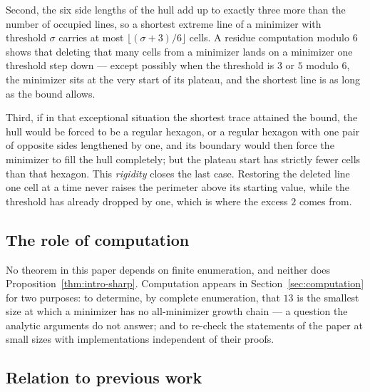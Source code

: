 \documentclass[11pt]{article}
\theoremstyle{plain}
\theoremstyle{definition}
\theoremstyle{remark}
\begin{document}
Second, the six side lengths of the hull add up to exactly three more than the number of
occupied lines, so a shortest extreme line of a minimizer with threshold \(\sigma\) carries at
most \(\lfloor(\sigma+3)/6\rfloor\) cells. A residue computation modulo \(6\) shows that
deleting that many cells from a minimizer lands on a minimizer one threshold step down ---
except possibly when the threshold is \(3\) or \(5\) modulo \(6\), the minimizer sits at the
very start of its plateau, and the shortest line is as long as the bound allows.

Third, if in that exceptional situation the shortest trace attained the bound, the hull
would be forced to be a regular hexagon, or a regular hexagon with one pair of opposite
sides lengthened by one, and its boundary would then force the minimizer to fill the hull
completely; but the plateau start has strictly fewer cells than that hexagon. This
\emph{rigidity} closes the last case. Restoring the deleted line one cell at a
time never raises the perimeter above its starting value, while the threshold has already
dropped by one, which is where the excess \(2\) comes from.

\subsection{The role of computation}\label{sec:0.4}

No theorem in this paper depends on finite enumeration, and neither does
Proposition~\ref{thm:intro-sharp}. Computation appears in Section~\ref{sec:computation} for
two purposes: to determine, by complete enumeration, that \(13\) is the smallest size at
which a minimizer has no all-minimizer growth chain --- a question the analytic arguments
do not answer; and to re-check the statements of the paper at small sizes with
implementations independent of their proofs.

\subsection{Relation to previous work}\label{sec:0.5}
\end{document}
